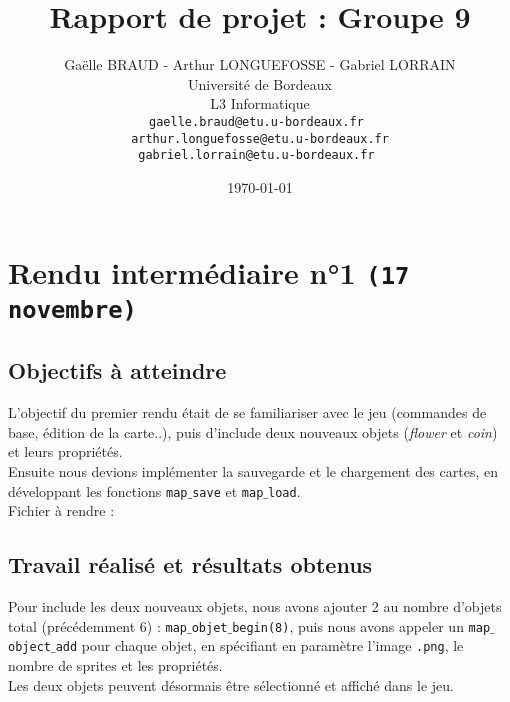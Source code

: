 \documentclass[a4paper, 12pt]{article}
\date{\today}
\begin{document}
\title{Rapport de projet : Groupe 9 }
\author{Gaëlle BRAUD - Arthur LONGUEFOSSE - Gabriel LORRAIN \\
   Université de Bordeaux \\
   L3 Informatique \\
   \texttt{gaelle.braud@etu.u-bordeaux.fr } \\
   \texttt{arthur.longuefosse@etu.u-bordeaux.fr} \\
   \texttt{gabriel.lorrain@etu.u-bordeaux.fr }}
   
\maketitle
\tableofcontents

\newpage
\section{Rendu intermédiaire n°1 \texttt{(17 novembre)}} 
	\subsection{Objectifs à atteindre}
	L'objectif du premier rendu était de se familiariser avec le jeu (commandes de base, édition de la carte..), puis d'include deux nouveaux objets (\textit{flower} et \textit{coin}) et leurs propriétés. \\ 
	Ensuite nous devions implémenter la sauvegarde et le chargement des cartes, en développant les fonctions \texttt{map$\_$save} et \texttt{map$\_$load}.\\
	
	Fichier à rendre :
	
	
	\subsection{Travail réalisé et résultats obtenus}
	
	Pour include les deux nouveaux objets, nous avons ajouter 2 au nombre d'objets total (précédemment 6) : \texttt{map$\_$objet$\_$begin(8)}, puis nous avons appeler un \texttt{map$\_$object$\_$add} pour chaque objet, en spécifiant en paramètre l'image \texttt{.png}, le nombre de sprites et les propriétés. \\
Les deux objets peuvent désormais être sélectionné et affiché dans le jeu. \\
\end{document}
